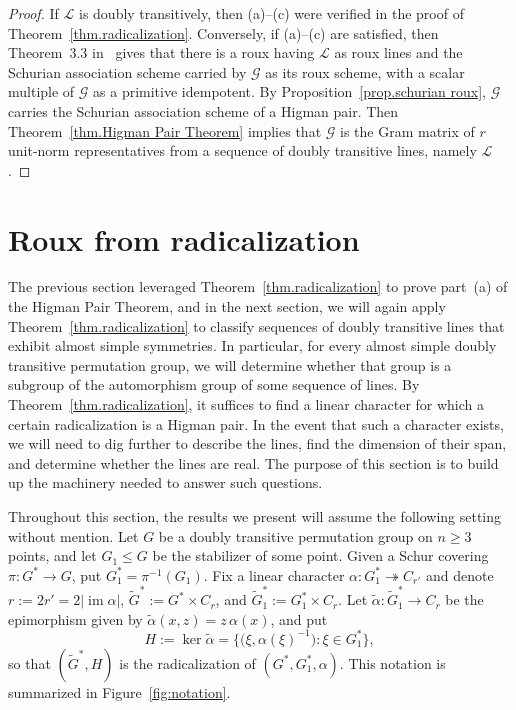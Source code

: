 \begin{proof}
If $\mathscr{L}$ is doubly transitively, then (a)--(c) were verified in the proof of Theorem~\ref{thm.radicalization}.
Conversely, if (a)--(c) are satisfied, then Theorem~3.3 in~\cite{IversonM:18} gives that there is a roux having $\mathscr{L}$ as roux lines and the Schurian association scheme carried by $\mathcal{G}$ as its roux scheme, with a scalar multiple of $\mathcal{G}$ as a primitive idempotent.
By Proposition~\ref{prop.schurian roux}, $\mathcal{G}$ carries the Schurian association scheme of a Higman pair.
Then Theorem~\ref{thm.Higman Pair Theorem} implies that $\mathcal{G}$ is the Gram matrix of $r$ unit-norm representatives from a sequence of doubly transitive lines, namely $\mathscr{L}$.
\end{proof}



\section{Roux from radicalization}
\label{sec.roux tech}

The previous section leveraged Theorem~\ref{thm.radicalization} to prove part~(a) of the Higman Pair Theorem, and in the next section, we will again apply Theorem~\ref{thm.radicalization} to classify sequences of doubly transitive lines that exhibit almost simple symmetries.
In particular, for every almost simple doubly transitive permutation group, we will determine whether that group is a subgroup of the automorphism group of some sequence of lines.
By Theorem~\ref{thm.radicalization}, it suffices to find a linear character for which a certain radicalization is a Higman pair.
In the event that such a character exists, we will need to dig further to describe the lines, find the dimension of their span, and determine whether the lines are real.
The purpose of this section is to build up the machinery needed to answer such questions.

\begin{remark}
\label{rem.setting}
Throughout this section, the results we present will assume the following setting without mention.
Let $G$ be a doubly transitive permutation group on $n\geq 3$ points, and let $G_1\leq G$ be the stabilizer of some point.
Given a Schur covering $\pi\colon G^* \to G$, put $G^*_1 = \pi^{-1}(G_1)$.
Fix a linear character $\alpha \colon G_1^* \twoheadrightarrow C_{r'}$ and denote $r := 2r' = 2|\operatorname{im} \alpha|$, $\widetilde{G}^* := G^* \times C_r$, and $\widetilde{G}_1^* := G_1^* \times C_r$.
Let $\widetilde{\alpha}\colon \widetilde{G}_1^* \to C_r$ be the epimorphism given by $\widetilde{\alpha}(x,z) = z\, \alpha(x)$, and put
\begin{equation}
\label{eq.H as kernel}
H := \ker \widetilde{\alpha} = \bigl\{ \bigl(\xi,\alpha(\xi)^{-1}\bigr) : \xi \in G_1^* \bigr\},
\end{equation}
so that $(\widetilde{G}^*,H)$ is the radicalization of $(G^*,G_1^*,\alpha)$.
This notation is summarized in Figure~\ref{fig:notation}.
\end{remark}

